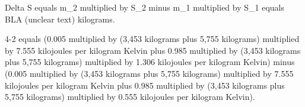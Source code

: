 Delta S equals m_2 multiplied by S_2 minus m_1 multiplied by S_1 equals BLA (unclear text) kilograms.  

4-2 equals (0.005 multiplied by (3,453 kilograms plus 5,755 kilograms) multiplied by 7.555 kilojoules per kilogram Kelvin plus 0.985 multiplied by (3,453 kilograms plus 5,755 kilograms) multiplied by 1.306 kilojoules per kilogram Kelvin) minus (0.005 multiplied by (3,453 kilograms plus 5,755 kilograms) multiplied by 7.555 kilojoules per kilogram Kelvin plus 0.985 multiplied by (3,453 kilograms plus 5,755 kilograms) multiplied by 0.555 kilojoules per kilogram Kelvin).
